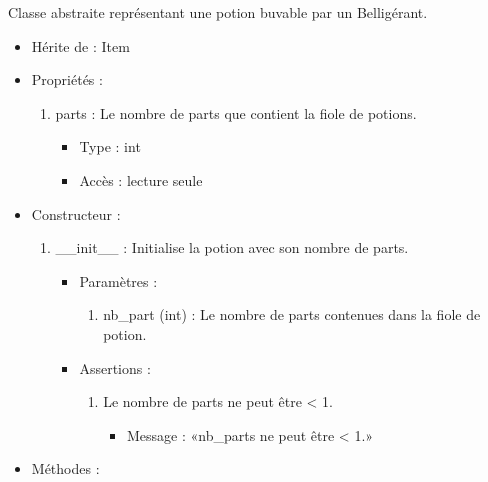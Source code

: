 \documentclass[12pt,pdftex,oneside]{article}
\begin{document}
  Classe abstraite représentant une potion buvable par un Belligérant.

  \begin{itemize}
  \item Hérite de : Item
  \item Propriétés : 
    \begin{enumerate}
    \item parts : Le nombre de parts que contient la fiole de potions.
          \begin{itemize}
          \item Type : int
          \item Accès : lecture seule
          \end{itemize}

    \end{enumerate}

  \item Constructeur : 

  \begin{enumerate}
  \item \_\_init\_\_ : Initialise la potion avec son nombre de parts.
    \begin{itemize}
    \item Paramètres : 
      \begin{enumerate}
      \item nb\_part (int) : Le nombre de parts contenues dans la fiole de potion.
      \end{enumerate}
    \item Assertions : 
      \begin{enumerate}
      \item Le nombre de parts ne peut être < 1.
        \begin{itemize}
          \item Message : «nb\_parts ne peut être < 1.»
        \end{itemize}
      \end{enumerate}
    \end{itemize}
  \end{enumerate}

  \item Méthodes : 


\end{itemize}
\end{document}
